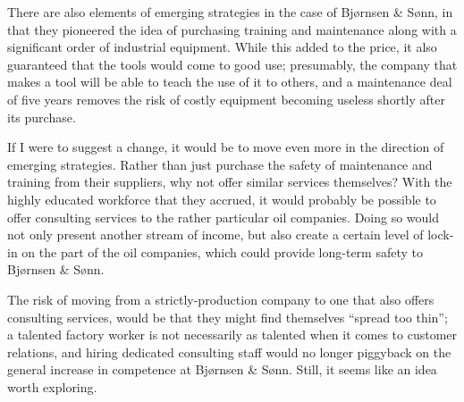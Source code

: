 \documentclass[a4paper]{article}
\begin{document}
    There are also elements of emerging strategies in the case of Bjørnsen
    \& Sønn, in that they pioneered the idea of purchasing training and
    maintenance along with a significant order of industrial equipment. While
    this added to the price, it also guaranteed that the tools would come to
    good use; presumably, the company that makes a tool will be able to teach
    the use of it to others, and a maintenance deal of five years removes the
    risk of costly equipment becoming useless shortly after its purchase.

    If I were to suggest a change, it would be to move even more in the
    direction of emerging strategies. Rather than just purchase the safety
    of maintenance and training from their suppliers, why not offer similar
    services themselves? With the highly educated workforce that they accrued,
    it would probably be possible to offer consulting services to the rather
    particular oil companies. Doing so would not only present another stream
    of income, but also create a certain level of lock-in on the part of the
    oil companies, which could provide long-term safety to Bjørnsen \& Sønn.

    The risk of moving from a strictly-production company to one that also
    offers consulting services, would be that they might find themselves
    ``spread too thin''; a talented factory worker is not necessarily as
    talented when it comes to customer relations, and hiring dedicated
    consulting staff would no longer piggyback on the general increase in
    competence at Bjørnsen \& Sønn. Still, it seems like an idea worth
    exploring.
\end{document}

